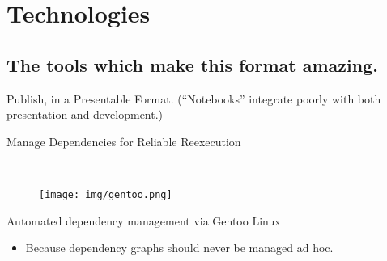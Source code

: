 	\section{Technologies}
		\subsection{The tools which make this format amazing.}
			\begin{frame}{Publish, in a Presentable Format.}
				\noindent{}\vspace{3em}
				\centering (“Notebooks” integrate poorly with both presentation and development.)
			\end{frame}
			\begin{frame}{Manage Dependencies for Reliable Reexecution}
				\begin{minipage}{.07\textwidth}~\end{minipage}%
				\begin{minipage}{.25\textwidth}
					\begin{figure}
						\texttt{[image: img/gentoo.png]}
					\end{figure}
				\end{minipage}
				\begin{minipage}{.65\textwidth}
					\begin{figure}
						\captionsetup{width=.9\linewidth}
						\vspace{-1.2em}
						\vspace{-1.8em}
						\vspace{1em}
					\end{figure}
				\end{minipage}
				\vspace{1em}

				\begin{centering}
				Automated dependency management via Gentoo Linux
				\begin{itemize}
					\item Because dependency graphs should never be managed ad hoc.
				\end{itemize}
				\end{centering}
			\end{frame}
